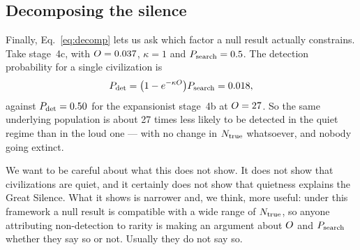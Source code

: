 \subsection{Decomposing the silence}

Finally, Eq.~\eqref{eq:decomp} lets us ask which factor a null result actually
constrains. Take stage~4c, with $O=0.037$, $\kappa=1$ and $P_{\mathrm{search}}=0.5$. The
detection probability for a single civilization is
\begin{equation}
  P_{\mathrm{det}} = \big(1-e^{-\kappa O}\big)P_{\mathrm{search}} = 0.018 ,
\end{equation}
against $P_{\mathrm{det}} = 0.50$ for the expansionist stage~4b at $O=27$. So the same
underlying population is about 27 times less likely to be detected in the quiet
regime than in the loud one --- with no change in $N_{\mathrm{true}}$ whatsoever, and
nobody going extinct. \Hypothetical

We want to be careful about what this does not show. It does not show that
civilizations are quiet, and it certainly does not show that quietness explains
the Great Silence. What it shows is narrower and, we think, more useful: under
this framework a null result is compatible with a wide range of $N_{\mathrm{true}}$, so
anyone attributing non-detection to rarity is making an argument about $O$
and $P_{\mathrm{search}}$ whether they say so or not. Usually they do not say so.
